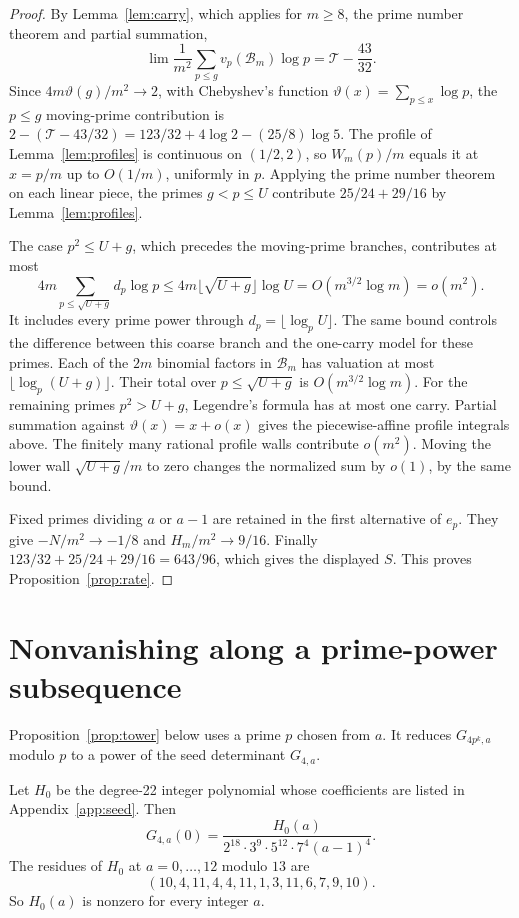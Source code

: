 \begin{proof}
By Lemma~\ref{lem:carry}, which applies for \(m\ge8\), the prime number theorem and partial summation,
\[
 \lim\frac1{m^2}\sum_{p\le g}v_p(\mathcal B_m)\log p=\mathcal T-\frac{43}{32}.
\]
Since \(4m \vartheta(g)/m^2 \to 2\), with Chebyshev's function \(\vartheta(x)=\sum_{p\le x}\log p\), the \(p\le{}g\) moving-prime contribution is \(2-(\mathcal T-43/32)=123/32+4 \log 2-(25/8)\log 5\). The profile of Lemma~\ref{lem:profiles} is continuous on \((1/2,2)\), so \(W_m(p)/m\) equals it at \(x=p/m\) up to \(O(1/m)\), uniformly in \(p\). Applying the prime number theorem on each linear piece, the primes \(g<p\le U\) contribute \(25/24+29/16\) by Lemma~\ref{lem:profiles}.

The case \(p^2\le{}U+g\), which precedes the moving-prime branches, contributes at most
\[
 4m\sum_{p\le\sqrt{U+g}}d_p\log p
 \le4m\lfloor\sqrt{U+g}\rfloor\log U
 =O(m^{3/2}\log m)=o(m^2).
\]
It includes every prime power through \(d_p=\lfloor\log_p U\rfloor\). The same bound controls the difference between this coarse branch and the one-carry model for these primes. Each of the \(2m\) binomial factors in \(\mathcal B_m\) has valuation at most \(\lfloor\log_p(U+g)\rfloor\). Their total over \(p\le\sqrt{U+g}\) is \(O(m^{3/2}\log m)\). For the remaining primes \(p^2>U+g\), Legendre's formula has at most one carry. Partial summation against \(\vartheta(x)=x+o(x)\) gives the piecewise-affine profile integrals above. The finitely many rational profile walls contribute \(o(m^2)\). Moving the lower wall \(\sqrt{U+g}/m\) to zero changes the normalized sum by \(o(1)\), by the same bound.

Fixed primes dividing \(a\) or \(a-1\) are retained in the first alternative of \(e_p\). They give \(-N/m^2\to-1/8\) and \(H_m/m^2\to9/16\). Finally \(123/32+25/24+29/16=643/96\), which gives the displayed \(S\). This proves Proposition~\ref{prop:rate}.
\end{proof}

\section{Nonvanishing along a prime-power subsequence}\label{sec:nonvanishing}

Proposition~\ref{prop:tower} below uses a prime \(p\) chosen from \(a\). It reduces \(G_{4p^k,a}\) modulo \(p\) to a power of the seed determinant \(G_{4,a}\).

\begin{lemma}\label{lem:seed}
Let \(H_0\) be the degree-22 integer polynomial whose coefficients are listed in Appendix~\ref{app:seed}. Then
\[
 G_{4,a}(0)=\frac{H_0(a)}{2^{18}\cdot3^{9}\cdot5^{12}\cdot7^{4}(a-1)^4}.
\]
The residues of \(H_0\) at \(a=0,\ldots,12\) modulo \(13\) are
\[
 (10,4,11,4,4,11,1,3,11,6,7,9,10).
\]
So \(H_0(a)\) is nonzero for every integer \(a\).
\end{lemma}

